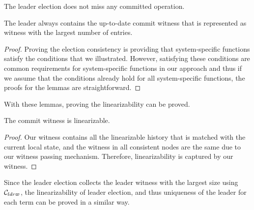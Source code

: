 \begin{lemma}\label{lemma:chapter:witnesspassing:election-consistency}
The leader election does not miss any committed operation.
\end{lemma}

\begin{lemma} 
The leader always contains the up-to-date commit witness that is represented as
witness with the largest number of entries.
\end{lemma}

\begin{proof}
Proving the election consistency is providing that system-specific functions satisfy the conditions that we illustrated. However, satisfying these
conditions are common requirements for system-specific functions in
our approach and thus if we assume that the conditions already hold for all
system-specific functions, the proofs for the lemmas are straightforward.
\end{proof}

With these lemmas, proving the linearizability can be proved.

\begin{theorem}[linearizability]\label{theorem:chapter:witnesspassing:linear-spec}
The commit witness is linearizable.
\end{theorem}

\begin{proof}
Our witness contains all the linearizable history that is matched with the current local state, 
and the witness in all consistent nodes are the same due to our witness passing mechanism. 
Therefore, linearizability is captured by our witness.
\end{proof}

Since the leader election collects the leader witness with the largest
size using $\mathcal{C}_{ldr\varpi}$, the linearizability of leader election, and thus uniqueness of the leader
for each term can be proved in a similar way. 
